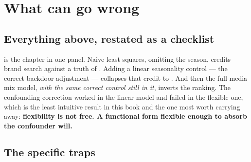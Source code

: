 \section{What can go wrong}
\label{sec:mmm:wrong}

\subsection*{Everything above, restated as a checklist}

 is the chapter in one panel. Naive least squares, omitting the season,
credits brand search \eur{\nbSixNaiveBs} against a truth of \eur{\nbSixTrueBs}. Adding a linear
seasonality control --- the correct backdoor adjustment --- collapses that credit to
\eur{\nbSixAdjBs}. And then the full media mix model, \emph{with the same correct control still in
it}, inverts the ranking. The confounding correction worked in the linear model and failed in the
flexible one, which is the least intuitive result in this book and the one most worth carrying
away: \textbf{flexibility is not free. A functional form flexible enough to absorb the confounder
will.}

\subsection*{The specific traps}

